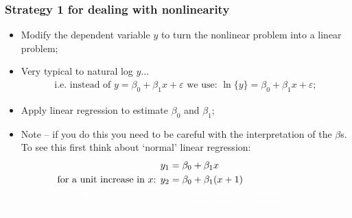 \documentclass[aspectratio=169]{beamer}
\theoremstyle{principle}
\begin{document}
\begin{frame}
\frametitle{Strategy 1 for dealing with nonlinearity}

\begin{itemize}
\item Modify the dependent variable $y$ to turn the nonlinear problem into a linear problem;
\item Very typical to natural log $y$...
\begin{align*}
\mbox{i.e. instead of }y = \beta_0 + \beta_1x + \varepsilon\mbox{ we use: }\ln\{y\} = \beta_0 + \beta_1x + \varepsilon;
\end{align*}
\item Apply linear regression to estimate $\beta_0$ and $\beta_1$;
\item Note -- if you do this you need to be careful with the interpretation of the $\beta$s.  To see this first think about `normal' linear regression:
\begin{align*}
y_1 &= \beta_0 + \beta_1x\\
\mbox{for a unit increase in $x$: } y_2 &= \beta_0 + \beta_1(x + 1)\color{white} = \beta_0 + \beta_1x + \beta_1\\
\color{white}\mbox{so change in $y$ is: }y_2 - y_1 &\color{white}= \underbrace{\beta_0 + \beta_1x + \beta_1}_{y_2} - \underbrace{\beta_0 - \beta_1x}_{y_1} = \beta_1.
\end{align*}

\end{itemize}

\end{frame}
\end{document}
